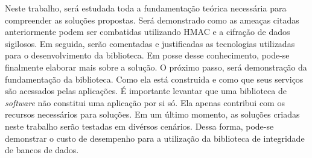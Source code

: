Neste trabalho, será estudada toda a fundamentação teórica necessária para compreender as soluções propostas. Será demonstrado como 
as ameaças citadas anteriormente podem ser combatidas utilizando \ac{HMAC} e a cifração de dados sigilosos. Em seguida, serão comentadas 
e justificadas as tecnologias utilizadas para o desenvolvimento da biblioteca. Em posse desse conhecimento, pode-se finalmente elaborar mais sobre a solução.
O próximo passo, será demonstração da fundamentação da biblioteca. Como ela está construida e como que seus serviços são acessados pelas aplicações. É importante 
levantar que uma biblioteca de \textit{software} não constitui uma aplicação por si só. Ela apenas contribui com os recursos necessários para soluções.
Em um último momento, as soluções criadas neste trabalho serão testadas em divérsos cenários. Dessa forma, pode-se demonstrar o custo de desempenho para a 
utilização da biblioteca de integridade de bancos de dados.



